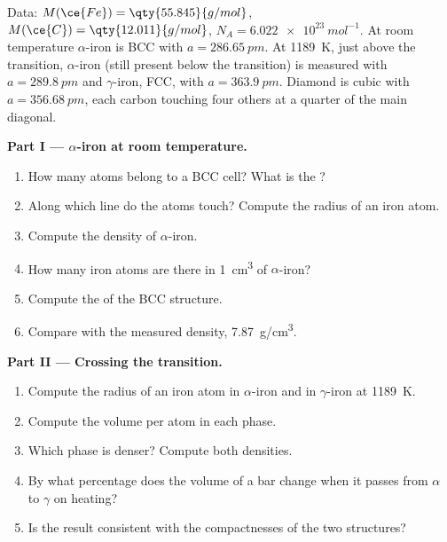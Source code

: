 \begin{problem}
\label{pb:b1:crystals-metals:1}
Data: $M(\ce{Fe}) = \qty{55.845}{g/mol}$, $M(\ce{C}) = \qty{12.011}{g/mol}$,
$N_A = \qty{6.022e23}{mol^{-1}}$. At room temperature $\alpha$-iron is BCC
with $a = \qty{286.65}{pm}$. At \qty{1189}{K}, just above the transition,
$\alpha$-iron (still present below the transition) is measured with
$a = \qty{289.8}{pm}$ and $\gamma$-iron, FCC, with $a = \qty{363.9}{pm}$.
Diamond is cubic with $a = \qty{356.68}{pm}$, each carbon touching four
others at a quarter of the main diagonal.

\medskip
\noindent\textbf{Part I --- $\alpha$-iron at room temperature.}
\begin{enumerate}
  \item How many atoms belong to a BCC cell? What is the ?
  \item Along which line do the atoms touch? Compute the radius of an
        iron atom.
  \item Compute the density of $\alpha$-iron.
  \item How many iron atoms are there in \qty{1}{cm^3} of $\alpha$-iron?
  \item Compute the  of the BCC structure.
  \item Compare with the measured density, \qty{7.87}{g/cm^3}.
\end{enumerate}

\medskip
\noindent\textbf{Part II --- Crossing the transition.}
\begin{enumerate}[resume]
  \item Compute the radius of an iron atom in $\alpha$-iron and in
        $\gamma$-iron at \qty{1189}{K}.
  \item Compute the volume per atom in each phase.
  \item Which phase is denser? Compute both densities.
  \item By what percentage does the volume of a bar change when it passes
        from $\alpha$ to $\gamma$ on heating?
  \item Is the result consistent with the compactnesses of the two
        structures?
\end{enumerate}


\end{problem}

